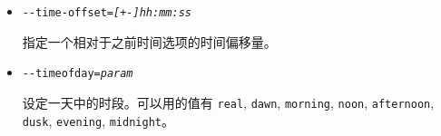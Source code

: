 {\begin{itemize}
{-$ $-time-match-local} 选项可以解决这个系统本地时间与虚拟飞行的时差问题，将你的本地系统时间与虚拟飞行的时间同步。

 不可与 \texttt{-$ $-start-date-gmt}, \texttt{-$ $-start-date-lat}, \texttt{-$ $-start-date-sys} 选项同时启用。

\item{\texttt{-$ $-time-offset={\it [+-]hh:mm:ss}}}

  指定一个相对于之前时间选项的时间偏移量。

\item{\texttt{-$ $-timeofday={\it param}}}

  设定一天中的时段。可以用的值有 \texttt{real}, \texttt{dawn}, \texttt{morning},
  \texttt{noon}, \texttt{afternoon}, \texttt{dusk}, \texttt{evening}, \texttt{midnight}。
\end{itemize}
}
\fi
\iffalse
